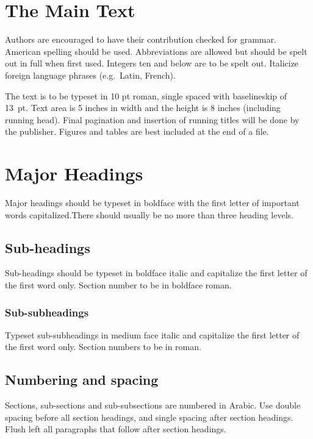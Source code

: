 \documentclass{ijcs_template}
\begin{document}



\section{The Main Text}
Authors are encouraged to have their contribution checked for grammar.
American spelling should be used. Abbreviations are allowed but should
be spelt out in full when first used. Integers ten and below are to be
spelt out. Italicize foreign language phrases (e.g.~Latin, French).

The text is to be typeset in 10 pt roman, single spaced with
baselineskip of 13~pt. Text area is 5 inches in width and the height
is 8 inches (including running head).  Final pagination and
insertion of running titles will be done by the publisher. Figures
and tables are best included at the end of a file.

\section{Major Headings}
Major headings should be typeset in boldface with the first letter
of important words capitalized.There should usually be no more than
three heading levels.

\subsection{Sub-headings}
Sub-headings should be typeset in boldface italic and capitalize the
first letter of the first word only. Section number to be in boldface
roman.

\subsubsection{Sub-subheadings}
Typeset sub-subheadings in medium face italic and capitalize the first
letter of the first word only. Section numbers to be in roman.

\subsection{Numbering and spacing}
Sections, sub-sections and sub-subsections are numbered in Arabic.
Use double spacing before all section headings, and single spacing
after section headings. Flush left all paragraphs that follow after
section headings.
\end{document}
